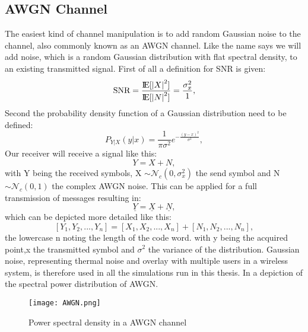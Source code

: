 \subsection{AWGN Channel}
\label{AWGN}

The easiest kind of channel manipulation is to add random Gaussian noise to the channel, also commonly known as an \gls{AWGN} channel. Like the name says we will add noise, which is a random Gaussian distribution with flat spectral density, to an existing transmitted signal.
First of all a definition for \acrfull{SNR} is given:
\begin{equation}
\label{eq:SNR}
\textrm{SNR} = \frac{\mbox{I\negthinspace E}[{\lvert X \rvert}^2]}{\mbox{I\negthinspace E}[{\lvert N \rvert}^2]} = \frac{\sigma_{x}^2}{1},
\end{equation}
Second the probability density function of a Gaussian distribution need to be defined:
\begin{equation}
\label{eq:AWGNpdf}
P_{Y|X}(y|x) = \frac{1}{\pi\sigma^2}e^{-\frac{(y-x)^2}{\sigma^2}},  
\end{equation}
Our receiver will receive a signal like this:
\begin{equation}
\label{eq:1.1}
Y = X + N ,
\end{equation}
with Y being the received symbols, X $\sim \mathcal{N}_c(0,\sigma_{x}^2)$ the send symbol and N $\sim \mathcal{N}_c(0,1)$ the complex AWGN noise. This can be applied for a full transmission of messages resulting in:
\begin{equation}
\label{eq:1.2}
\underline{Y} = \underline{X} + \underline{N},
\end{equation}
which can be depicted more detailed like this:
\begin{equation}
\label{eq:1.3}
[Y_1,Y_2,...,Y_n] = [X_1,X_2,...,X_n] + [N_1,N_2,...,N_n],
\end{equation}
the lowercase n noting the length of the code word.
with y being the acquired point,x the transmitted symbol and $\sigma^2$ the variance of the distribution.
Gaussian noise, representing thermal noise and overlay with multiple users in a wireless system, is therefore used in all the simulations run in this thesis. In  a depiction of the spectral power distribution of \gls{AWGN}.
\begin{figure}[!htb]
	\centering
	\texttt{[image: AWGN.png]}
	\caption{Power spectral density in a AWGN channel}
	\label{fig:AWGNSP}
\end{figure}
\newpage
